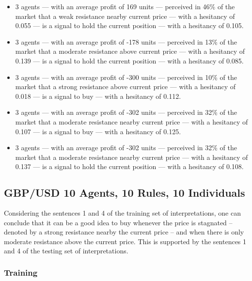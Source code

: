 {\small
  \begin{itemize}
  \item 3 agents — with an average profit of 169 units — perceived in 46\% of
    the market that a weak resistance nearby current price — with a hesitancy of
    0.055 — is a signal to hold the current position — with a hesitancy of
    0.105.
  \item 3 agents — with an average profit of -178 units — perceived in 13\% of
    the market that a moderate resistance above current price — with a hesitancy
    of 0.139 — is a signal to hold the current position — with a hesitancy of
    0.085.
  \item 3 agents — with an average profit of -300 units — perceived in 10\% of
    the market that a strong resistance above current price — with a hesitancy
    of 0.018 — is a signal to buy — with a hesitancy of 0.112.
  \item 3 agents — with an average profit of -302 units — perceived in 32\% of
    the market that a moderate resistance nearby current price — with a
    hesitancy of 0.107 — is a signal to buy — with a hesitancy of 0.125.
  \item 3 agents — with an average profit of -302 units — perceived in 32\% of
    the market that a moderate resistance nearby current price — with a
    hesitancy of 0.137 — is a signal to hold the current position — with a
    hesitancy of 0.108.
  \end{itemize}
}

\subsection{GBP/USD 10 Agents, 10 Rules, 10 Individuals}
\label{results:interpretation-gbp-usd-10agents-10rules-10individuals}

Considering the sentences 1 and 4 of the training set of interpretations, one can conclude that it can be a good idea to buy whenever the price is stagnated -- denoted by a strong resistance nearby the current price -- and when there is only moderate resistance above the current price. This is supported by the sentences 1 and 4 of the testing set of interpretations.

\subsubsection{Training}

